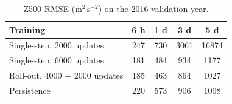 \documentclass{article}
\begin{document}
\begin{table}[H]
  \caption{Z500 RMSE (m$^2$\,s$^{-2}$) on the 2016 validation year.}
  \label{tab:rollout}
  \centering
  \small
  \begin{tabular}{lcccc}
    \toprule
    Training & 6 h & 1 d & 3 d & 5 d \\
    \midrule
    Single-step, 2000 updates   & 247 & 730 & 3061 & 16874 \\
    Single-step, 6000 updates   & 181 & 484 & 934  & 1177 \\
    Roll-out, 4000 + 2000 updates & 185 & 463 & 864  & 1027 \\
    Persistence                 & 220 & 573 & 906  & 1008 \\
    \bottomrule
  \end{tabular}
\end{table}
\end{document}
